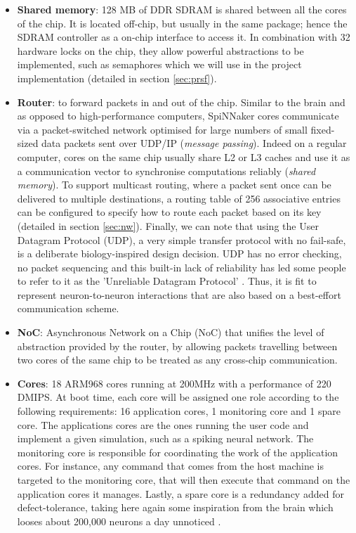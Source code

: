 \begin{itemize}
\item \textbf{Shared memory}: 128 MB of DDR SDRAM is shared between all the cores of the chip. It is located off-chip, but usually in the same package; hence the SDRAM controller as a on-chip interface to access it. In combination with 32 hardware locks on the chip, they allow powerful abstractions to be implemented, such as semaphores which we will use in the project implementation (detailed in section \ref{sec:prsf}).

\item \textbf{Router}: to forward packets in and out of the chip. Similar to the brain and as opposed to high-performance computers, SpiNNaker cores communicate via a packet-switched network optimised for large numbers of small fixed-sized data packets sent over UDP/IP (\textit{message passing}). Indeed on a regular computer, cores on the same chip usually share L2 or L3 caches and use it as a communication vector to synchronise computations reliably (\textit{shared memory}). To support multicast routing, where a packet sent once can be delivered to multiple destinations, a routing table of 256 associative entries \cite{testchip} can be configured to specify how to route each packet based on its key (detailed in section \ref{sec:nw}). Finally, we can note that using the User Datagram Protocol (UDP), a very simple transfer protocol with no fail-safe, is a deliberate biology-inspired design decision. UDP has no error checking, no packet sequencing and this built-in lack of reliability has led some people to refer to it as the 'Unreliable Datagram Protocol' \cite{udp}. Thus, it is fit to represent neuron-to-neuron interactions that are also based on a best-effort communication scheme.

\item \textbf{NoC}: Asynchronous Network on a Chip (NoC) that unifies the level of abstraction provided by the router, by allowing packets travelling between two cores of the same chip to be treated as any cross-chip communication.

\item \textbf{Cores}: 18 ARM968 cores running at 200MHz with a performance of 220 DMIPS. At boot time, each core will be assigned one role according to the following requirements: 16 application cores, 1 monitoring core and 1 spare core. The applications cores are the ones running the user code and implement a given simulation, such as a spiking neural network. The monitoring core is responsible for coordinating the work of the application cores. For instance, any command that comes from the host machine is targeted to the monitoring core, that will then execute that command on the application cores it manages. Lastly, a spare core is a redundancy added for defect-tolerance, taking here again some inspiration from the brain which looses about 200,000 neurons a day unnoticed \cite{neuron-loss}. 


\end{itemize}
